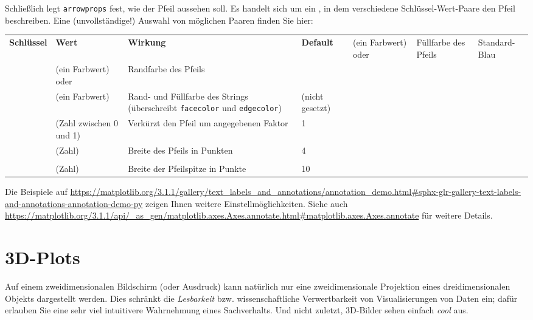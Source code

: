 Schließlich legt \texttt{arrowprops} fest, wie der Pfeil aussehen soll. Es handelt sich um ein , in dem verschiedene Schlüssel-Wert-Paare den Pfeil beschreiben. Eine (unvollständige!) Auswahl von möglichen Paaren finden Sie hier:
\begin{center}
\begin{tabular}{m{.15\linewidth}m{.15\linewidth}m{.4\linewidth}m{.15\linewidth}}
	\textbf{Schlüssel} & \textbf{Wert}                     & \textbf{Wirkung}        & \textbf{Default} \tabcrlf
	 & (ein Farbwert) oder  & Füllfarbe des Pfeils    & Standard-Blau    \\
	 & (ein Farbwert) oder  & Randfarbe des Pfeils    &    \\
	     & (ein Farbwert)                    & Rand- und Füllfarbe des
	                                                         Strings (überschreibt
	                                                         \texttt{facecolor} und
	                                                         \texttt{edgecolor})     & (nicht gesetzt)  \\
	   & (Zahl zwischen 0 und 1)            & Verkürzt den Pfeil um 
	                                                         angegebenen Faktor      & 1                \\
      & (Zahl)                             & Breite des Pfeils in 
                                                           Punkten                 & 4                \\
  \\
  & (Zahl)                             & Breite der Pfeilspitze
                                                           in Punkte               & 10
\end{tabular}
\end{center}

Die Beispiele auf \url{https://matplotlib.org/3.1.1/gallery/text_labels_and_annotations/annotation_demo.html#sphx-glr-gallery-text-labels-and-annotations-annotation-demo-py} zeigen Ihnen weitere Einstellmöglichkeiten. Siehe auch \url{https://matplotlib.org/3.1.1/api/_as_gen/matplotlib.axes.Axes.annotate.html#matplotlib.axes.Axes.annotate} für weitere Details.

\section{3D-Plots}
Auf einem zweidimensionalen Bildschirm (oder Ausdruck) kann natürlich nur eine zweidimensionale Projektion eines dreidimensionalen Objekts dargestellt werden. Dies schränkt die \emph{Lesbarkeit} bzw. wissenschaftliche Verwertbarkeit von Visualisierungen von Daten ein; dafür erlauben Sie eine sehr viel intuitivere Wahrnehmung eines Sachverhalts. Und nicht zuletzt, 3D-Bilder sehen einfach \emph{cool} aus.

